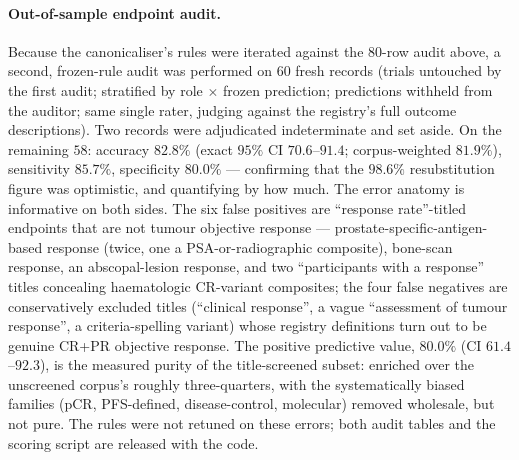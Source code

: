 \documentclass[11pt]{article}
\begin{document}
\paragraph{Out-of-sample endpoint audit.} Because the canonicaliser's rules
were iterated against the $80$-row audit above, a second, frozen-rule audit
was performed on $60$ fresh records (trials untouched by the first audit;
stratified by role $\times$ frozen prediction; predictions withheld from
the auditor; same single rater, judging against the registry's full
outcome descriptions). Two records were adjudicated indeterminate and set
aside. On the remaining $58$: accuracy $82.8\%$ (exact $95\%$ CI
$70.6$--$91.4$; corpus-weighted $81.9\%$), sensitivity $85.7\%$,
specificity $80.0\%$ --- confirming that the $98.6\%$ resubstitution figure
was optimistic, and quantifying by how much. The error anatomy is
informative on both sides. The six false positives are ``response
rate''-titled endpoints that are not tumour objective response ---
prostate-specific-antigen-based response (twice, one a PSA-or-radiographic
composite), bone-scan response, an
abscopal-lesion response, and two ``participants with a response'' titles
concealing haematologic CR-variant composites; the four false negatives
are conservatively excluded titles (``clinical response'', a vague
``assessment of tumour response'', a criteria-spelling variant) whose
registry definitions turn out to be genuine CR+PR objective response. The
positive predictive value, $80.0\%$ (CI $61.4$--$92.3$), is the measured
purity of the title-screened subset: enriched over the unscreened corpus's
roughly three-quarters, with the systematically biased families (pCR,
PFS-defined, disease-control, molecular) removed wholesale, but not pure.
The rules were not retuned on these errors; both audit tables and the
scoring script are released with the code.
\end{document}
